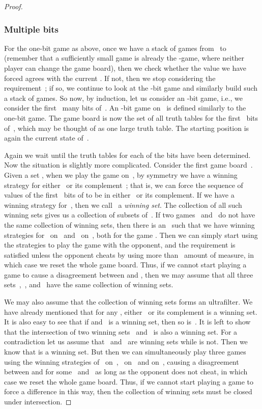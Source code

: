 \documentclass{LMCS}
\newcommand{\0}{\mathbf{0}}
\newcommand{\<}{\langle}
\renewcommand{\>}{\rangle}
\begin{document}
\begin{proof}
\subsubsection{Multiple bits}\label{multiple bits}

For the one-bit game as above, once we have a stack of games
from~ to~ (remember that a sufficiently small game is already
the -game, where neither player can change the game board), then we check
whether the value  we have forced agrees with the current
. If not, then we stop considering the requirement~;
if so, we continue to look at the -bit game and similarly build such a
stack of games. So now, by induction, let us consider an -bit game, i.e.,
we consider the first~ many bits of~.
An -bit game  on~ is defined similarly to the
one-bit game.  The game board is now the set of all truth tables for the
first~ bits of~, which may be thought of as one large truth table.
The starting position is again the current state of~.

Again we wait until the truth tables for each of the  bits have been
determined. Now the situation is slightly more complicated. Consider the
first game board~. Given a set , when we play the game
 on~, by symmetry we have a winning strategy
for either~ or its complement~; that is, we can force the
sequence of values of the first~ bits of  to be in
either~ or its complement. If we have a winning strategy for~, then we
call~ a {\em winning set}. The collection of all such winning sets gives
us a collection of subsets of~. If two games~ and~ do not have
the same collection of winning sets, then there is an~ such that we have
winning strategies for~ on~ and~ on~, both for the
game . Then we can simply start using the
strategies to play the game with the opponent, and the requirement is
satisfied unless the opponent cheats by using more than~ amount
of measure, in which case we reset the whole game board. Thus, if we cannot
start playing a game to cause a disagreement between  and
, then we may assume that all three sets~,~,
and~ have the same collection of winning sets.

We may also assume that the collection of winning sets forms an ultrafilter.
We have already mentioned that for any , either~ or its
complement is a winning set.  It is also easy to see that if 
and~ is a winning set, then so is~.  It is left to show that the
intersection of two winning sets~ and~ is also a winning set.  For a
contradiction let us assume that~ and~ are winning sets while 
is not. Then we know that  is a winning set.  But then we
can simultaneously play three games using the winning strategies of~
on~,~ on~ and  on~, causing a
disagreement between  and  for some~ and~
as long as the opponent does not cheat, in which case we reset the whole game
board.  Thus, if we cannot start playing a game to force a difference in this
way, then the collection of winning sets must be closed under intersection.


\end{proof}
\end{document}

